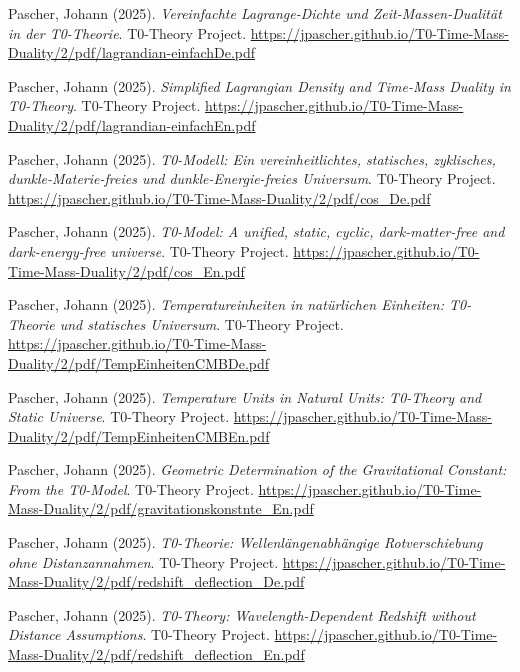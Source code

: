 \documentclass[12pt,a4paper]{article}
\begin{document}
	\begin{thebibliography}{20}
		
		Pascher, Johann (2025). 
		\textit{Vereinfachte Lagrange-Dichte und Zeit-Massen-Dualit\"at in der T0-Theorie}. 
		T0-Theory Project. 
		\url{https://jpascher.github.io/T0-Time-Mass-Duality/2/pdf/lagrandian-einfachDe.pdf}
		
		Pascher, Johann (2025). 
		\textit{Simplified Lagrangian Density and Time-Mass Duality in T0-Theory}. 
		T0-Theory Project. 
		\url{https://jpascher.github.io/T0-Time-Mass-Duality/2/pdf/lagrandian-einfachEn.pdf}
		
		Pascher, Johann (2025). 
		\textit{T0-Modell: Ein vereinheitlichtes, statisches, zyklisches, dunkle-Materie-freies und dunkle-Energie-freies Universum}. 
		T0-Theory Project. 
		\url{https://jpascher.github.io/T0-Time-Mass-Duality/2/pdf/cos_De.pdf}
		
		Pascher, Johann (2025). 
		\textit{T0-Model: A unified, static, cyclic, dark-matter-free and dark-energy-free universe}. 
		T0-Theory Project. 
		\url{https://jpascher.github.io/T0-Time-Mass-Duality/2/pdf/cos_En.pdf}
		
		Pascher, Johann (2025). 
		\textit{Temperatureinheiten in nat\"urlichen Einheiten: T0-Theorie und statisches Universum}. 
		T0-Theory Project. 
		\url{https://jpascher.github.io/T0-Time-Mass-Duality/2/pdf/TempEinheitenCMBDe.pdf}
		
		Pascher, Johann (2025). 
		\textit{Temperature Units in Natural Units: T0-Theory and Static Universe}. 
		T0-Theory Project. 
		\url{https://jpascher.github.io/T0-Time-Mass-Duality/2/pdf/TempEinheitenCMBEn.pdf}
		
		Pascher, Johann (2025). 
		\textit{Geometric Determination of the Gravitational Constant: From the T0-Model}. 
		T0-Theory Project. 
		\url{https://jpascher.github.io/T0-Time-Mass-Duality/2/pdf/gravitationskonstnte_En.pdf}
		
		Pascher, Johann (2025). 
		\textit{T0-Theorie: Wellenl\"angenabh\"angige Rotverschiebung ohne Distanzannahmen}. 
		T0-Theory Project. 
		\url{https://jpascher.github.io/T0-Time-Mass-Duality/2/pdf/redshift_deflection_De.pdf}
		
		Pascher, Johann (2025). 
		\textit{T0-Theory: Wavelength-Dependent Redshift without Distance Assumptions}. 
		T0-Theory Project. 
		\url{https://jpascher.github.io/T0-Time-Mass-Duality/2/pdf/redshift_deflection_En.pdf}
		

\end{thebibliography}
\end{document}
